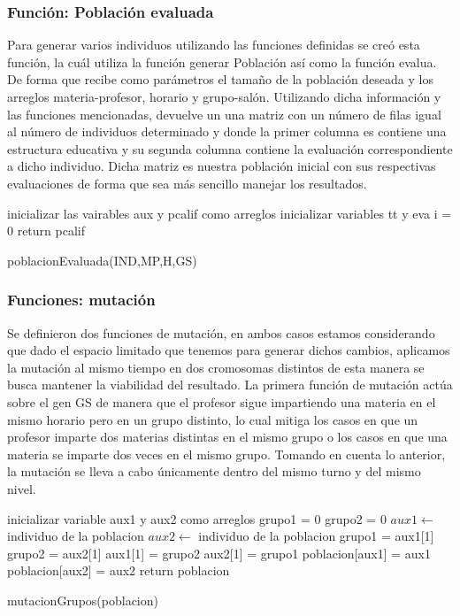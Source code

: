 \subsubsection{Función: Población evaluada}

Para generar varios individuos utilizando las funciones definidas se creó esta función, la cuál utiliza la función generar Población así como la función evalua. De forma que recibe como parámetros el tamaño de la población deseada y los arreglos materia-profesor, horario y grupo-salón. Utilizando dicha información y las funciones mencionadas, devuelve un una matriz con un número de filas igual al número de individuos determinado y donde la primer columna es contiene una estructura educativa y su segunda columna contiene la evaluación correspondiente a dicho individuo. Dicha matriz es nuestra población inicial con sus respectivas evaluaciones de forma que sea más sencillo manejar los resultados.\\

\begin{algorithm}[H]
	\DontPrintSemicolon
	\SetAlgoLined
	inicializar las vairables aux y pcalif como arreglos\;
	inicializar variables tt y eva
	i = 0\;
	return pcalif\;
	\caption{poblacionEvaluada(IND,MP,H,GS)}
\end{algorithm}


\subsubsection{Funciones: mutación}


Se definieron dos funciones de mutación, en ambos casos estamos considerando que dado el espacio limitado que tenemos para generar dichos cambios, aplicamos la mutación al mismo tiempo en dos cromosomas distintos de esta manera se busca mantener la viabilidad del resultado. La primera función de mutación  actúa sobre el gen GS de manera que el profesor sigue impartiendo una materia en el mismo horario pero en un grupo distinto, lo cual mitiga los casos en que un profesor imparte dos materias distintas en el mismo grupo o los casos en que una materia se imparte dos veces en el mismo grupo. Tomando en cuenta lo anterior, la mutación se lleva a cabo únicamente dentro del mismo turno y del mismo nivel.\\ 


\begin{algorithm}[H]
	\DontPrintSemicolon
	\SetAlgoLined
	inicializar variable aux1 y aux2 como arreglos\;
	grupo1 = 0\;
	grupo2 = 0\;
	$aux1 \leftarrow $ individuo de la poblacion\;
	$aux2 \leftarrow $ individuo de la poblacion\;
	grupo1 = aux1[1]\;
	grupo2 = aux2[1]\;
	aux1[1] = grupo2\;
	aux2[1] = grupo1\;
	poblacion[aux1] = aux1\;
	poblacion[aux2] = aux2\;
	return poblacion \;
	\caption{mutacionGrupos(poblacion)}
\end{algorithm}

